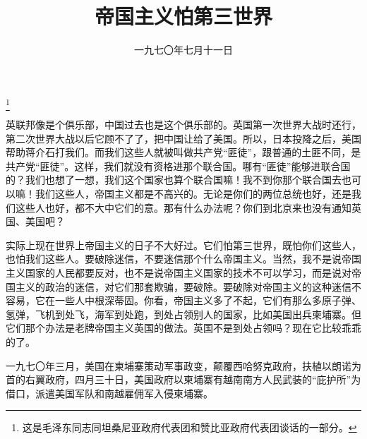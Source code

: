 
\title{帝国主义怕第三世界}
\date{一九七〇年七月十一日}
\thanks{这是毛泽东同志同坦桑尼亚政府代表团和赞比亚政府代表团谈话的一部分。}
\maketitle


英联邦像是个俱乐部，中国过去也是这个俱乐部的。英国第一次世界大战时还行，第二次世界大战以后它顾不了了，把中国让给了美国。所以，日本投降之后，美国帮助蒋介石打我们。而我们这些人就被叫做共产党“匪徒”，跟普通的土匪不同，是共产党“匪徒”。这样，我们就没有资格进那个联合国。哪有“匪徒”能够进联合国的？我们也想了一想，我们这个国家也算个联合国嘛！我不到你那个联合国去也可以嘛！我们这些人，帝国主义都是不高兴的。无论是你们的两位总统也好，还是我们这些人也好，都不大中它们的意。那有什么办法呢？你们到北京来也没有通知英国、美国吧？

实际上现在世界上帝国主义的日子不大好过。它们怕第三世界，既怕你们这些人，也怕我们这些人。要破除迷信，不要迷信那个什么帝国主义。当然，我不是说帝国主义国家的人民都要反对，也不是说帝国主义国家的技术不可以学习，而是说对帝国主义的政治的迷信，对它们那套欺骗，要破除。要破除对帝国主义的这种迷信不容易，它在一些人中根深蒂固。你看，帝国主义多了不起，它们有那么多原子弹、氢弹，飞机到处飞，海军到处跑，到处占领别人的国家，比如美国出兵柬埔寨。但它们那个办法是老牌帝国主义英国的做法。英国不是到处占领吗？现在它比较乖乖的了。

\begin{maonote}
一九七〇年三月，美国在柬埔寨策动军事政变，颠覆西哈努克政府，扶植以朗诺为首的右翼政府，四月三十日，美国政府以柬埔寨有越南南方人民武装的“庇护所”为借口，派遣美国军队和南越雇佣军入侵柬埔寨。
\end{maonote}
